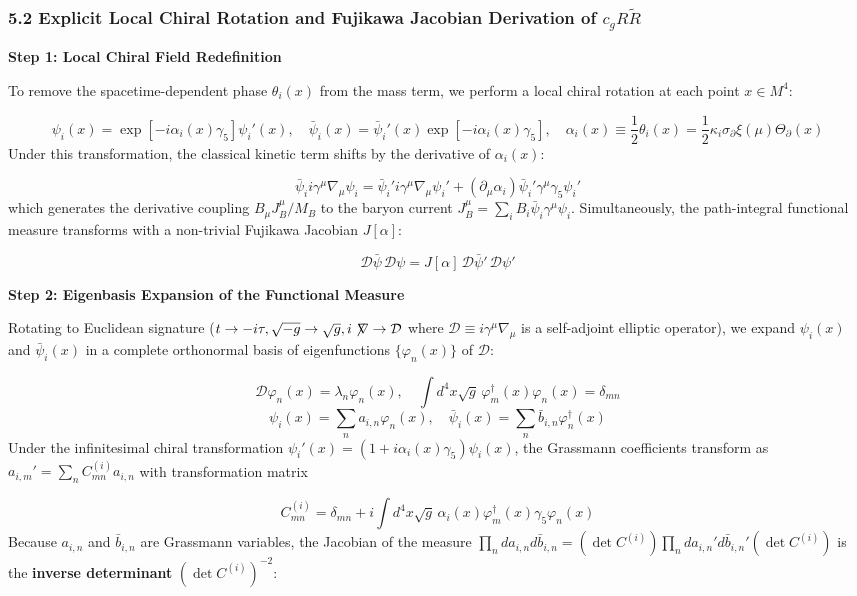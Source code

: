 \documentclass[aps,prd,onecolumn,superscriptaddress,nofootinbib,longbibliography,10pt]{revtex4-2}
\begin{document}
{{  
  
\subsubsection*{5.2 Explicit Local Chiral Rotation and Fujikawa Jacobian Derivation of \(c_g R\tilde{R}\)}

  \textbf{Step 1: Local Chiral Field Redefinition}


  To remove the spacetime-dependent phase \(\theta_i(x)\) from the mass term, we perform a local chiral rotation at each point \(x \in M^4\):


  \[ \psi_i(x) = \exp\left[-i\alpha_i(x)\gamma_5\right]\psi_i'(x), \quad \bar{\psi}_i(x) = \bar{\psi}_i'(x)\exp\left[-i\alpha_i(x)\gamma_5\right], \quad \alpha_i(x) \equiv \frac{1}{2}\theta_i(x) = \frac{1}{2}\kappa_i\sigma_\partial\xi(\mu)\Theta_\partial(x) \]
  Under this transformation, the classical kinetic term shifts by the derivative of \(\alpha_i(x)\):


  \[ \bar{\psi}_i i\gamma^\mu\nabla_\mu\psi_i = \bar{\psi}_i' i\gamma^\mu\nabla_\mu\psi_i' + (\partial_\mu\alpha_i)\bar{\psi}_i'\gamma^\mu\gamma_5\psi_i' \]
  which generates the derivative coupling \(B_\mu J_B^\mu / M_B\) to the baryon current \(J_B^\mu = \sum_i B_i\bar{\psi}_i\gamma^\mu\psi_i\). Simultaneously, the path-integral functional measure transforms with a non-trivial Fujikawa Jacobian \(J[\alpha]\):


  \[ \mathcal{D}\bar{\psi}\,\mathcal{D}\psi = J[\alpha]\,\mathcal{D}\bar{\psi}'\,\mathcal{D}\psi' \]

  \textbf{Step 2: Eigenbasis Expansion of the Functional Measure}


  Rotating to Euclidean signature (\(t \to -i\tau, \sqrt{-g} \to \sqrt{g}, i\not\!\nabla \to \mathcal{D}\) where \(\mathcal{D} \equiv i\gamma^\mu\nabla_\mu\) is a self-adjoint elliptic operator), we expand \(\psi_i(x)\) and \(\bar{\psi}_i(x)\) in a complete orthonormal basis of eigenfunctions \(\{\varphi_n(x)\}\) of \(\mathcal{D}\):


  \[ \mathcal{D}\varphi_n(x) = \lambda_n\varphi_n(x), \quad \int d^4x\sqrt{g}\,\varphi_m^\dagger(x)\varphi_n(x) = \delta_{mn} \]
  \[ \psi_i(x) = \sum_n a_{i,n}\varphi_n(x), \quad \bar{\psi}_i(x) = \sum_n \bar{b}_{i,n}\varphi_n^\dagger(x) \]
  Under the infinitesimal chiral transformation \(\psi_i'(x) = (1 + i\alpha_i(x)\gamma_5)\psi_i(x)\), the Grassmann coefficients transform as \(a_{i,m}' = \sum_n C_{mn}^{(i)}a_{i,n}\) with transformation matrix


  \[ C_{mn}^{(i)} = \delta_{mn} + i\int d^4x\sqrt{g}\,\alpha_i(x)\varphi_m^\dagger(x)\gamma_5\varphi_n(x) \]
  Because \(a_{i,n}\) and \(\bar{b}_{i,n}\) are Grassmann variables, the Jacobian of the measure \(\prod_n da_{i,n}d\bar{b}_{i,n} = (\det C^{(i)})\prod_n da_{i,n}'d\bar{b}_{i,n}'(\det C^{(i)})\) is the \textbf{inverse determinant} \((\det C^{(i)})^{-2}\):


}}
\end{document}

